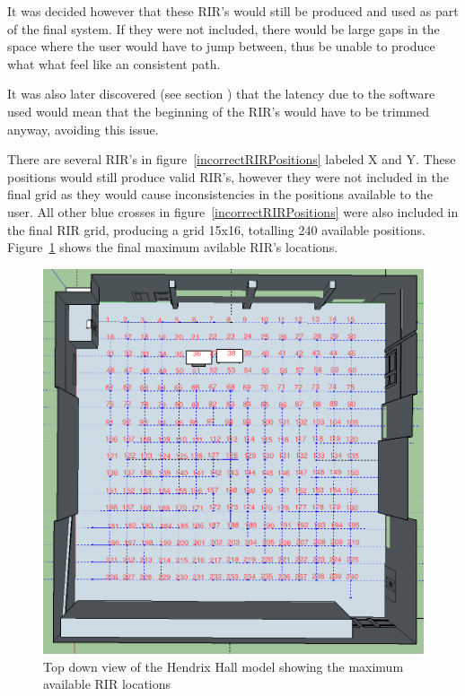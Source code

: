 \documentclass[../../main.tex]{subfiles}
\begin{document}
			It was decided however that these \ac{RIR}'s would still be produced and used as part of the final system. If they were not included, there would be large gaps in the space where the user would have to jump between, thus be unable to produce what what feel like an consistent path.

			It was also later discovered (see section ) that the latency due to the software used would mean that the beginning of the \ac{RIR}'s would have to be trimmed anyway, avoiding this issue.

			There are several \ac{RIR}'s in figure~\ref{incorrectRIRPositions} labeled X and Y. These positions would still produce valid \ac{RIR}'s, however they were not included in the final grid as they would cause inconsistencies in the positions available to the user. All other blue crosses in figure~\ref{incorrectRIRPositions} were also included in the final \ac{RIR} grid, producing a grid 15x16, totalling 240 available positions. Figure~\ref{bulkRIRs} shows the final maximum avilable \ac{RIR}'s locations.

			\begin{figure}[H]
				\centerline{\includegraphics[scale = 0.4]{Sections/Implementation/Odeon/images/RIRPositions/RIR_Position_Bulk.png}}
				\caption{Top down view of the Hendrix Hall model showing the maximum available \ac{RIR} locations}
				\label{bulkRIRs}
			\end{figure}
\end{document}
